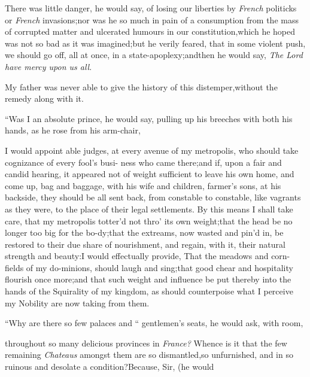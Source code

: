 \documentclass{article}
\begin{document}
There was little danger, he would say, of losing our liberties
by \textit{French} politicks or \textit{French}
invasions;\tsh  nor was he so much in pain of a consumption
from the mass of corrupted matter and ulcerated humours in our
constitution,\tsh\break which he hoped was not so bad as it was
imagined;\tsk  but he verily feared, that in some violent push, we
should go off, all at once, in a state-apoplexy;\tsk  and\pb then he
would say, \textit{The Lord have mercy upon us all}.

My father was never able to give the history of this
distemper,\tsk  without the remedy along with it.

“Was I an absolute prince, he would say, pulling up his breeches
with both his hands, as he rose from his arm-chair,\break
\begin{story}{I would appoint able judges, at every} 
avenue of my metropolis, who should 
take cognizance of every fool’s busi-\break
ness who came there;\tsk and if, upon\break
a fair and candid hearing, it appeared\break
not of weight sufficient to leave his\break
own home, and come up, bag and\break
baggage, with his wife and children,\break
farmer’s sons, \etc \etc at his backside,\break
they should be all sent back, from\break
constable to constable, like vagrants\pb 
as they were, to the place of their legal settlements.
By this means I shall take care, that my metropolis totter’d not
thro’ its own weight;\tsk  that the
head be no longer too big for the
bo-\break dy;\tsk  that the extreams, now wasted and pin’d in, be restored to
their due share of nourishment, and regain, with it, their natural strength and
beauty:\tsk\break I would effectually provide, That the meadows and corn-fields of
my do-\break minions, should laugh and sing;\tsh\break that good chear and hospitality
flourish once more;\tsk  and that such weight and influence be put thereby
into the hands of the Squirality of my kingdom, as should counterpoise what I
perceive my Nobility are now taking from them.
\end{story}

\newpage
“Why are there so few palaces and\break
“ gentlemen’s seats, he would ask, with\break
{}\break room, 
\begin{story}{throughout so many delicious}
provinces in \textit{France?} Whence is it that the few
remaining \textit{Chateaus} amongst them are so dismantled,\tsk  so unfurnished,
and in so ruinous and desolate a condition?\tsh  Because, Sir,
(he would
\end{story}
\end{document}
